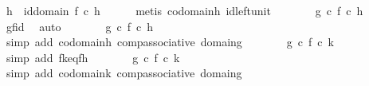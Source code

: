 \begin{isabellebody}
\ {\isachardoublequoteopen}h\ {\isacharequal}{\kern0pt}\ id{\isacharparenleft}{\kern0pt}domain\ f{\isacharparenright}{\kern0pt}\ {\isasymcirc}\isactrlsub c\ h{\isachardoublequoteclose}\isanewline
\ \ \ \ \isamarkupfalse%
\ {\isacharparenleft}{\kern0pt}metis\ codomain{\isacharunderscore}{\kern0pt}h\ id{\isacharunderscore}{\kern0pt}left{\isacharunderscore}{\kern0pt}unit{\isacharparenright}{\kern0pt}\isanewline
\ \ \isamarkupfalse%
\ \isamarkupfalse%
\ {\isachardoublequoteopen}{\isachardot}{\kern0pt}{\isachardot}{\kern0pt}{\isachardot}{\kern0pt}\ {\isacharequal}{\kern0pt}\ {\isacharparenleft}{\kern0pt}g\ {\isasymcirc}\isactrlsub c\ f{\isacharparenright}{\kern0pt}\ {\isasymcirc}\isactrlsub c\ h{\isachardoublequoteclose}\isanewline
\ \ \ \ \isamarkupfalse%
\ gf{\isacharunderscore}{\kern0pt}id\ \isamarkupfalse%
\ auto\isanewline
\ \ \isamarkupfalse%
\ \isamarkupfalse%
\ {\isachardoublequoteopen}{\isachardot}{\kern0pt}{\isachardot}{\kern0pt}{\isachardot}{\kern0pt}\ {\isacharequal}{\kern0pt}\ g\ {\isasymcirc}\isactrlsub c\ {\isacharparenleft}{\kern0pt}f\ {\isasymcirc}\isactrlsub c\ h{\isacharparenright}{\kern0pt}{\isachardoublequoteclose}\isanewline
\ \ \ \ \isamarkupfalse%
\ {\isacharparenleft}{\kern0pt}simp\ add{\isacharcolon}{\kern0pt}\ codomain{\isacharunderscore}{\kern0pt}h\ comp{\isacharunderscore}{\kern0pt}associative\ domain{\isacharunderscore}{\kern0pt}g{\isacharparenright}{\kern0pt}\isanewline
\ \ \isamarkupfalse%
\ \isamarkupfalse%
\ {\isachardoublequoteopen}{\isachardot}{\kern0pt}{\isachardot}{\kern0pt}{\isachardot}{\kern0pt}\ {\isacharequal}{\kern0pt}\ g\ {\isasymcirc}\isactrlsub c\ {\isacharparenleft}{\kern0pt}f\ {\isasymcirc}\isactrlsub c\ k{\isacharparenright}{\kern0pt}{\isachardoublequoteclose}\isanewline
\ \ \ \ \isamarkupfalse%
\ {\isacharparenleft}{\kern0pt}simp\ add{\isacharcolon}{\kern0pt}\ fk{\isacharunderscore}{\kern0pt}eq{\isacharunderscore}{\kern0pt}fh{\isacharparenright}{\kern0pt}\isanewline
\ \ \isamarkupfalse%
\ \isamarkupfalse%
\ {\isachardoublequoteopen}{\isachardot}{\kern0pt}{\isachardot}{\kern0pt}{\isachardot}{\kern0pt}\ {\isacharequal}{\kern0pt}\ {\isacharparenleft}{\kern0pt}g\ {\isasymcirc}\isactrlsub c\ f{\isacharparenright}{\kern0pt}\ {\isasymcirc}\isactrlsub c\ k{\isachardoublequoteclose}\isanewline
\ \ \ \ \isamarkupfalse%
\ {\isacharparenleft}{\kern0pt}simp\ add{\isacharcolon}{\kern0pt}\ codomain{\isacharunderscore}{\kern0pt}k\ comp{\isacharunderscore}{\kern0pt}associative\ domain{\isacharunderscore}{\kern0pt}g{\isacharparenright}{\kern0pt}\isanewline

\end{isabellebody}
